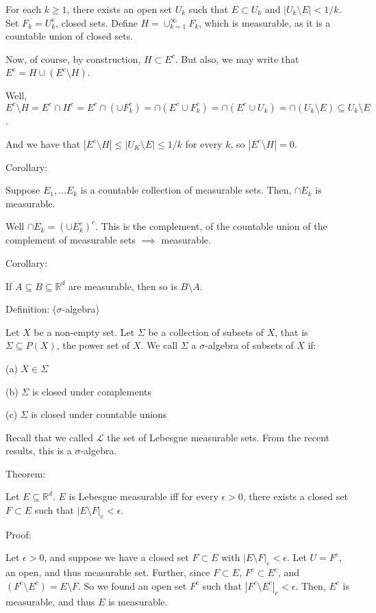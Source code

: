 \documentclass[10pt]{article}
\begin{document}
For each $k \geq 1$, there exists an open set $U_k$ such that $E \subset U_k$ and $|U_k \setminus E| < 1/k$.
Set $F_k = U_k^c$, closed sets. Define $H = \cup_{k=1}^\infty F_k$, which is measurable, as it is a countable union of closed sets.

Now, of course, by construction, $H \subset E^c$. But also, we may write that $E^c = H \cup (E^c \setminus H)$.

Well, $E^c \setminus H = E^c \cap H^c = E^c \cap ( \cup F_k^c) = \cap (E^c \cup F_k^c) = \cap (E^c \cup U_k) = \cap (U_k \setminus E) \subseteq U_k \setminus E$.

And we have that $|E^c \setminus H| \leq |U_K \setminus E| \leq 1/k$ for every $k$, so $|E^c \setminus H| = 0$.

Corollary:

Suppose $E_1,...E_k$ is a countable collection of measurable sets. Then, $\cap E_k$ is measurable.

Well $\cap E_k = (\cup E_k^c)^c$. This is the complement, of the countable union of the complement of measurable sets $\implies$ measurable.

Corollary: 

If $A \subseteq B \subseteq \mathbb{R}^d$ are measurable, then so is $B \setminus A$.

Definition: ($\sigma$-algebra)

Let $X$ be a non-empty set. Let $\Sigma$ be a collection of subsets of $X$, that is $\Sigma \subseteq P(X)$, the power set of $X$. We call $\Sigma$ a $\sigma$-algebra of subsets of $X$ if:

(a) $X \in \Sigma$

(b) $\Sigma$ is closed under complements

(c) $\Sigma$ is closed under countable unions

Recall that we called $\mathcal{L}$ the set of Lebesgue measurable sets. From the recent results, this is a $\sigma$-algebra.

Theorem:

Let $E \subseteq \mathbb{R}^d$. $E$ is Lebesgue measurable iff for every $\epsilon > 0$, there exists a closed set $F \subset E$ such that $|E \setminus F|_e < \epsilon$. 

Proof:

Let $\epsilon > 0$, and suppose we have a closed set $F \subset E$ with $|E \setminus F|_e < \epsilon$. Let $U = F^c$, an open, and thus measurable set. Further, since $F \subset E$, $ F^c \subset E^c$, and $(F^c \setminus E^c) = E \setminus F$. So we found an open set $F^c$ such that $|F^c \setminus E^c|_e < \epsilon$. Then, $E^c$ is measurable, and thus $E$ is measurable.
\end{document}
